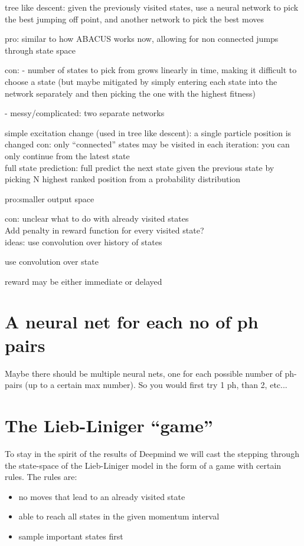 \documentclass[11pt, a4paper]{report} %
\begin{document}
tree like descent: given the previously visited states, use a neural network to pick the best jumping off point, and another network to pick the best moves

pro: similar to how ABACUS works now, allowing for non connected jumps through state space

con: - number of states to pick from grows linearly in time, making it difficult to choose a state (but maybe mitigated by simply entering each state into the network separately and then picking the one with the highest fitness)

- messy/complicated: two separate networks

simple excitation change (used in tree like descent): a single particle position is changed
con: only ``connected'' states may be visited in each iteration: you can only continue from the latest state
\\
full state prediction: full predict the next state given the previous state by picking N highest ranked position from a probability distribution

pro:smaller output space

con: unclear what to do with already visited states
\\
Add penalty in reward function for every visited state?
\\
ideas:
use convolution over history of states

use convolution over state

reward may be either immediate or delayed

\section{A neural net for each no of ph pairs}
Maybe there should be multiple neural nets, one for each possible number of ph-pairs (up to a certain max number).
So you would first try 1 ph, than 2, etc...

\section{The Lieb-Liniger ``game''}

To stay in the spirit of the results of Deepmind we will cast the stepping through the state-space of the Lieb-Liniger model in the form of a game with certain rules.
The rules are:
\begin{itemize}
  \item no moves that lead to an already visited state
  \item able to reach all states in the given momentum interval
  \item sample important states first
\end{itemize}
\end{document}
